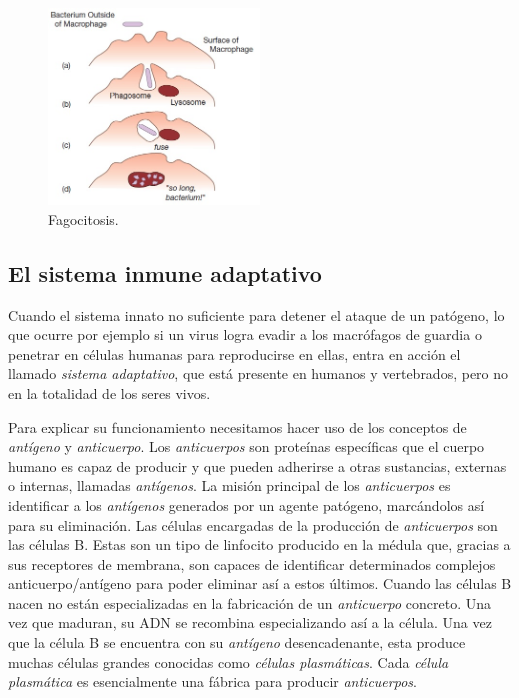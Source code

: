 \begin{figure}[t]
	\centering
	\includegraphics[width=0.5\textwidth]{1_macrofago}
	\caption{Fagocitosis.}
	\label{fig:macrofago}
\end{figure}




\subsection{El sistema inmune adaptativo}
\label{sub:sistInmAdap}

Cuando el sistema innato no suficiente para detener el ataque de un patógeno, lo que ocurre por ejemplo si un virus logra evadir  a los macrófagos de guardia o  penetrar en células humanas para reproducirse en ellas, entra en acción el llamado \textit{sistema adaptativo}, que está presente en humanos y vertebrados, pero no en la totalidad de los seres vivos.
 

Para explicar su funcionamiento necesitamos hacer uso de los conceptos de \textit{antígeno} y \textit{anticuerpo}. Los \textit{anticuerpos} son proteínas específicas que el cuerpo humano es capaz de producir y que pueden adherirse a otras sustancias, externas o internas, llamadas \textit{antígenos}. La misión principal de los \textit{anticuerpos} es identificar a los \textit{antígenos} generados por un agente patógeno, marcándolos así para su eliminación. Las células encargadas de la producción de \textit{anticuerpos} son las células B. Estas son un tipo de linfocito producido en la médula que, gracias a sus receptores de membrana, son capaces de identificar determinados complejos anticuerpo/antígeno para poder eliminar así a estos últimos. Cuando las células B nacen no están especializadas en la fabricación de un \textit{anticuerpo} concreto. Una vez que maduran, su ADN se recombina especializando así a la célula. Una vez que la célula B se encuentra con su \textit{antígeno} desencadenante, esta produce muchas células grandes conocidas como \textit{células plasmáticas}. Cada \textit{célula plasmática} es esencialmente una fábrica para producir \textit{anticuerpos}. 

